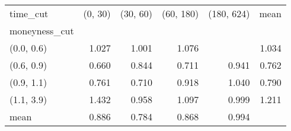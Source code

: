 \begin{tabular}{lrrrrr}
\toprule
time\_cut &  (0, 30) &  (30, 60) &  (60, 180) &  (180, 624) &  mean \\
moneyness\_cut &          &           &            &             &       \\
\midrule
(0.0, 0.6)    &    1.027 &     1.001 &      1.076 &             & 1.034 \\
(0.6, 0.9)    &    0.660 &     0.844 &      0.711 &       0.941 & 0.762 \\
(0.9, 1.1)    &    0.761 &     0.710 &      0.918 &       1.040 & 0.790 \\
(1.1, 3.9)    &    1.432 &     0.958 &      1.097 &       0.999 & 1.211 \\
mean          &    0.886 &     0.784 &      0.868 &       0.994 &       \\
\bottomrule
\end{tabular}
